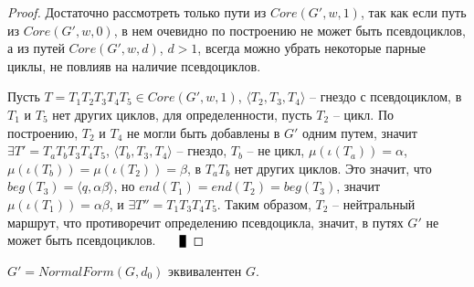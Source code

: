 \begin{proof}
    Достаточно рассмотреть только пути из $Core(G',w,1)$, так как если путь из $Core(G',w,0)$, в нем очевидно 
    по построению не может быть псевдоциклов, а из путей $Core(G',w,d)$, $d > 1$, всегда можно убрать
    некоторые парные циклы, не повлияв на наличие псевдоциклов.

    Пусть $T = T_1 T_2 T_3 T_4 T_5 \in Core(G',w,1)$, $\langle T_2, T_3, T_4 \rangle$ -- гнездо с псевдоциклом,
    в $T_1$ и $T_5$ нет других циклов,
    для определенности, пусть $T_2$ -- цикл.
    По построению, $T_2$ и $T_4$ не могли быть добавлены в $G'$ одним путем, значит 
    $\exists T' = T_a T_b T_3 T_4 T_5$, $\langle T_b, T_3, T_4 \rangle$ -- гнездо, $T_b$ -- не цикл,
    $\mu(\iota(T_a)) = \alpha$,
    $\mu(\iota(T_b)) = \mu(\iota(T_2)) = \beta$,
    в $T_a T_b$ нет других циклов.
    Это значит, что $beg(T_3) = \langle q, \alpha \beta \rangle$, но $end(T_1) = end(T_2) = beg(T_3)$,
    значит $\mu(\iota(T_1)) = \alpha \beta$, и $\exists T'' = T_1 T_3 T_4 T_5$.
    Таким образом, $T_2$ -- нейтральный маршрут, что противоречит определению псевдоцикла, 
    значит, в путях $G'$ не может быть псевдоциклов. $\qed$ 
\end{proof}

\begin{theorem}
    $G' = NormalForm(G, d_0)$ эквивалентен $G$.
\end{theorem}

